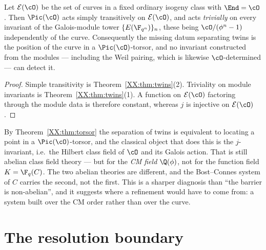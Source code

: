 \begin{theorem}\label{XX:thm:torsor}
Let $\mathcal E(\cO)$ be the set of curves in a fixed ordinary isogeny class with
$\End=\cO$. Then $\Pic(\cO)$ acts simply transitively on $\mathcal E(\cO)$, and acts
\emph{trivially} on every invariant of the Galois-module tower $\{E(\F_{q^n})\}_n$, these being
$\cO/(\phi^n-1)$ independently of the curve. Consequently the missing datum separating twins
is the position of the curve in a $\Pic(\cO)$-torsor, and no invariant constructed from the
modules --- including the Weil pairing, which is likewise $\cO$-determined --- can detect it.
\end{theorem}

\begin{proof}
Simple transitivity is Theorem~\ref{XX:thm:twins}(2). Triviality on module invariants is
Theorem~\ref{XX:thm:twins}(1). A function on $\mathcal E(\cO)$ factoring through the module data
is therefore constant, whereas $j$ is injective on $\mathcal E(\cO)$.
\end{proof}

\begin{remark}\label{XX:rem:needed}
By Theorem~\ref{XX:thm:torsor} the separation of twins is equivalent to locating a point in a
$\Pic(\cO)$-torsor, and the classical object that does this is the $j$-invariant, i.e.\ the
Hilbert class field of $\cO$ and its Galois action. That is still abelian class field theory
--- but for the \emph{CM field} $\Q(\phi)$, not for the function field $K=\F_q(C)$. The two
abelian theories are different, and the Bost--Connes system of $C$ carries the second, not the
first. This is a sharper diagnosis than ``the barrier is non-abelian'', and it suggests
where a refinement would have to come from: a system built over the CM order rather than over
the curve.
\end{remark}

\section{The resolution boundary}

